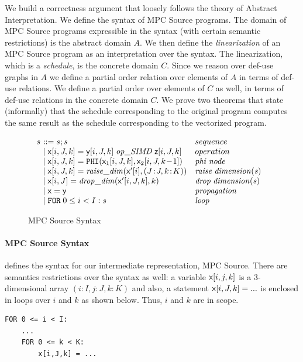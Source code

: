 \documentclass[sigconf, screen, natbib=false, dvipsnames, table]{acmart}
\theoremstyle{definition}
\begin{document}
We build a correctness argument that loosely follows the theory of Abstract Interpretation. 
We define the syntax of MPC Source programs. The domain of MPC Source programs
expressible in the syntax (with certain semantic restrictions) is the abstract domain $A$. 
We then define the \emph{linearization} of an MPC Source program as an interpretation 
over the syntax. The linearization, which is a \emph{schedule}, is the concrete domain $C$. 
Since we reason over def-use graphs in $A$ we define a partial order relation over elements of $A$ 
in terms of def-use relations. We define a partial order over elements of $C$ as well,
in terms of def-use relations in the concrete domain $C$. We prove two theorems
that state (informally) that the schedule corresponding to the original program computes the same 
result as the schedule corresponding to the vectorized program.


\begin{figure}%
\[
\begin{array}{l@{~~~~~}l}
  \begin{array}{l@{~}l@{~~~}l}
  s &::= s;s & sequence \\
     & \mid \x[i,J,k] = \y[i,J,k] \; \mathit{op\_SIMD} \; \z[i,J,k] & operation \\ 
     & \mid \x[i,J,k]  = \texttt{PHI}(\x_1[i,J,k],\x_2[i,J,k\!-\!1]) & \mathit{phi} \; \mathit{node} \\
     & \mid \x[i,J,k] = \mathit{raise\_dim}(\x'[i],(J\!:\!J,k\!:\!K)) & \mathit{raise} \; \mathit{dimension(s)} \\
     & \mid \x[i,J] = \mathit{drop\_dim}(\x'[i,J,k],k)  & \mathit{drop} \; \mathit{dimension(s)} \\
     & \mid \x = \y & \mathit{propagation} \\
     & \mid \texttt{FOR} \; 0 \le i < I: s  & \mathit{loop} \\
  \end{array}    \\
\end{array}
\]
\vspace{-3mm}
\caption{MPC Source Syntax}\label{fig:MPC_Source_syntax}
\vspace{-5mm}
\end{figure}

\paragraph{MPC Source Syntax}

 defines the syntax for our intermediate representation, MPC Source. 
There are semantics restrictions over the syntax as well: a variable ${\sf {x}}[i,j,k]$ is a 3-dimensional array 
$(i:I,j:J,k:K)$ and also, a statement ${\sf {x}}[i,J,k] = ...$ is enclosed in loops over $i$ and $k$ as shown below. 
Thus, $i$ and $k$ are in scope.
\begin{verbatim}
FOR 0 <= i < I:
    ...
    FOR 0 <= k < K:
        x[i,J,k] = ...
\end{verbatim}
\end{document}
